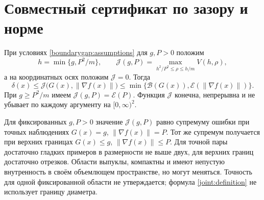 \section{Совместный сертификат по зазору и норме}
\label{joint:section}

\begin{theorem}
\label{joint:main}
При условиях \eqref{boundarygap:assumptions} для $g,P>0$ положим
\begin{equation}\label{joint:definition}
 h=\min\{g,P^2/m\},\qquad
 \mathcal J(g,P)=\max_{h^2/P^2\le\rho\le h/m}V(h,\rho),
\end{equation}
а на координатных осях положим $\mathcal J=0$. Тогда
\begin{equation}\label{joint:bound}
 \delta(x)\le\mathcal J\bigl(G(x),\|\nabla f(x)\|\bigr)
 \le\min\{\mathcal B(G(x)),\mathcal E(\|\nabla f(x)\|)\}.
\end{equation}
При $g\ge P^2/m$ имеем $\mathcal J(g,P)=\mathcal E(P)$.
Функция $\mathcal J$ конечна, непрерывна и не убывает по каждому
аргументу на $[0,\infty)^2$.

Для фиксированных $g,P>0$ значение $\mathcal J(g,P)$ равно
супремуму ошибки при точных наблюдениях $G(x)=g$,
$\|\nabla f(x)\|=P$. Тот же супремум получается при верхних
границах $G(x)\le g$, $\|\nabla f(x)\|\le P$.
Для точной пары достаточно гладких примеров в размерности не выше
двух, для верхних границ достаточно отрезков. Области выпуклы,
компактны и имеют непустую внутренность в своём объемлющем
пространстве, но могут меняться. Точность для одной фиксированной
области не утверждается; формула \eqref{joint:definition}
не использует границу диаметра.
\end{theorem}

